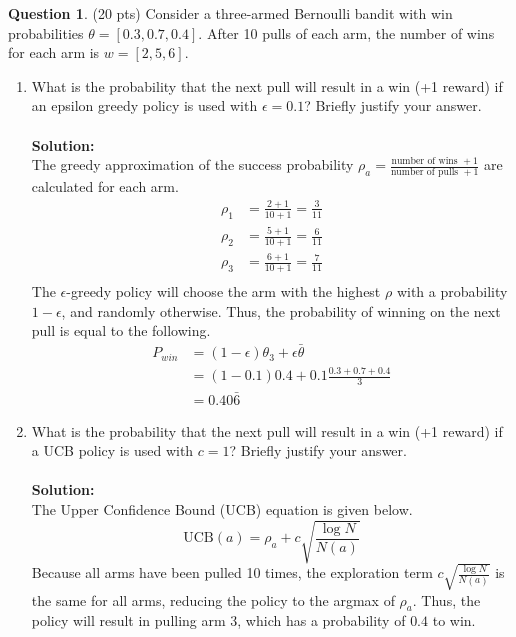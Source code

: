 \documentclass{article}
\theoremstyle{definition}
\newtheorem{question}[thm]{Question}
\begin{document}
\clearpage

\begin{question} (20 pts)
    Consider a three-armed Bernoulli bandit with win probabilities $\theta = [0.3, 0.7, 0.4]$. After 10 pulls of each arm, the number of wins for each arm is $w = [2, 5, 6]$.
    \begin{enumerate}[label=(\alph*)]
        \item What is the probability that the next pull will result in a win (+1 reward) if an epsilon greedy policy is used with $\epsilon = 0.1$? Briefly justify your answer.
        \\ \\ \noindent \textbf{Solution: }\\
        The greedy approximation of the success probability $\rho_a = \frac{\text{number of wins } + 1}{\text{number of pulls } + 1}$ are calculated for each arm.
        \begin{align*}
            \rho_1 &= \frac{2 + 1}{10 + 1} = \frac{3}{11}\\
            \rho_2 &= \frac{5 + 1}{10 + 1} = \frac{6}{11}\\
            \rho_3 &= \frac{6 + 1}{10 + 1} = \frac{7}{11}\\
        \end{align*}
        The $\epsilon$-greedy policy will choose the arm with the highest $\rho$ with a probability $1 -\epsilon$, and randomly otherwise. Thus, the probability of winning on the next pull is equal to the following.
        \begin{align*}
            P_{win} &= (1 - \epsilon)\theta_3 + \epsilon\bar{\theta}\\
            &= (1 - 0.1)0.4 + 0.1\frac{0.3 + 0.7 + 0.4}{3}\\
            &= 0.40\bar{6}
        \end{align*}
        \item What is the probability that the next pull will result in a win (+1 reward) if a UCB policy is used with $c = 1$? Briefly justify your answer.
        \\ \\ \noindent \textbf{Solution: }\\
        The Upper Confidence Bound (UCB) equation is given below.
        \begin{equation*}
            \text{UCB}(a) = \rho_a + c\sqrt{\frac{\log{N}}{N(a)}}
        \end{equation*}
        Because all arms have been pulled 10 times, the exploration term $c\sqrt{\frac{\log{N}}{N(a)}}$ is the same for all arms, reducing the policy to the argmax of $\rho_a$. Thus, the policy will result in pulling arm 3, which has a probability of $0.4$ to win. 

\end{enumerate}
\end{question}
\end{document}
